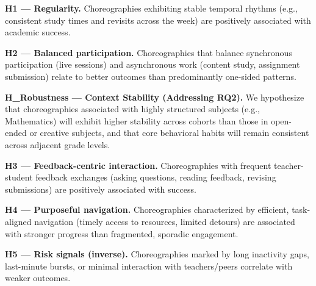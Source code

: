 \medskip
\noindent\textbf{H1 — Regularity.}
Choreographies exhibiting stable temporal rhythms (e.g., consistent study times and revisits across the week) are positively associated with academic success.

\medskip
\noindent\textbf{H2 — Balanced participation.}
Choreographies that balance synchronous participation (live sessions) and asynchronous work (content study, assignment submission) relate to better outcomes than predominantly one-sided patterns.

\medskip
\noindent\textbf{H\_Robustness — Context Stability (Addressing RQ2).}
We hypothesize that choreographies associated with highly structured subjects (e.g., Mathematics) will exhibit higher stability across cohorts than those in open-ended or creative subjects, and that core behavioral habits will remain consistent across adjacent grade levels.

\medskip
\noindent\textbf{H3 — Feedback-centric interaction.}
Choreographies with frequent teacher-student feedback exchanges (asking questions, reading feedback, revising submissions) are positively associated with success.

\medskip
\noindent\textbf{H4 — Purposeful navigation.}
Choreographies characterized by efficient, task-aligned navigation (timely access to resources, limited detours) are associated with stronger progress than fragmented, sporadic engagement.

\medskip
\noindent\textbf{H5 — Risk signals (inverse).}
Choreographies marked by long inactivity gaps, last-minute bursts, or minimal interaction with teachers/peers correlate with weaker outcomes.